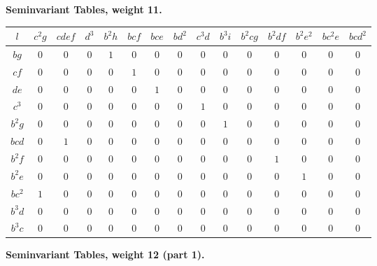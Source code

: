 \documentclass[12pt,a4paper]{article}
\begin{document}
\newpage
\textbf{Seminvariant Tables, weight 11.}

\begin{longtable}{|c|c|c|c|c|c|c|c|c|c|c|c|c|c|c|}
\hline
$l$ & $c^2g$ & $cdef$ & $d^3$ & $b^2h$ & $bcf$ & $bce$ & $bd^2$ & $c^3d$ & $b^3i$ & $b^2cg$ & $b^2df$ & $b^2e^2$ & $bc^2e$ & $bcd^2$\\
\hline
\endhead
$bg$ & $0$ & $0$ & $0$ & $1$ & $0$ & $0$ & $0$ & $0$ & $0$ & $0$ & $0$ & $0$ & $0$ & $0$\\
$cf$ & $0$ & $0$ & $0$ & $0$ & $1$ & $0$ & $0$ & $0$ & $0$ & $0$ & $0$ & $0$ & $0$ & $0$\\
$de$ & $0$ & $0$ & $0$ & $0$ & $0$ & $1$ & $0$ & $0$ & $0$ & $0$ & $0$ & $0$ & $0$ & $0$\\
$c^3$ & $0$ & $0$ & $0$ & $0$ & $0$ & $0$ & $0$ & $1$ & $0$ & $0$ & $0$ & $0$ & $0$ & $0$\\
$b^2g$ & $0$ & $0$ & $0$ & $0$ & $0$ & $0$ & $0$ & $0$ & $1$ & $0$ & $0$ & $0$ & $0$ & $0$\\
$bcd$ & $0$ & $1$ & $0$ & $0$ & $0$ & $0$ & $0$ & $0$ & $0$ & $0$ & $0$ & $0$ & $0$ & $0$\\
$b^2f$ & $0$ & $0$ & $0$ & $0$ & $0$ & $0$ & $0$ & $0$ & $0$ & $0$ & $1$ & $0$ & $0$ & $0$\\
$b^2e$ & $0$ & $0$ & $0$ & $0$ & $0$ & $0$ & $0$ & $0$ & $0$ & $0$ & $0$ & $1$ & $0$ & $0$\\
$bc^2$ & $1$ & $0$ & $0$ & $0$ & $0$ & $0$ & $0$ & $0$ & $0$ & $0$ & $0$ & $0$ & $0$ & $0$\\
$b^3d$ & $0$ & $0$ & $0$ & $0$ & $0$ & $0$ & $0$ & $0$ & $0$ & $0$ & $0$ & $0$ & $0$ & $0$\\
$b^3c$ & $0$ & $0$ & $0$ & $0$ & $0$ & $0$ & $0$ & $0$ & $0$ & $0$ & $0$ & $0$ & $0$ & $0$\\
\hline
\end{longtable}

\newpage
\textbf{Seminvariant Tables, weight 12 (part 1).}
\end{document}
